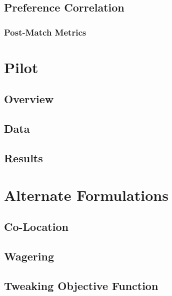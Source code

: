 \documentclass{article}
\begin{document}


\subsection{Preference Correlation}



\subsubsection{Post-Match Metrics}



\section{Pilot}

\subsection{Overview}



\subsection{Data}



\subsection{Results}

\section{Alternate Formulations}

\subsection{Co-Location}



\subsection{Wagering}



\subsection{Tweaking Objective Function}
\end{document}
